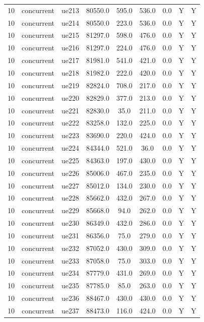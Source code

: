 \begin{table}[ht]
\begin{tabular}{|c|c|c|c|c|c|c|c|c|}
10 & concurrent & ue213 & 80550.0 & 595.0 & 536.0 & 0.0 & Y & Y \\
10 & concurrent & ue214 & 80550.0 & 223.0 & 536.0 & 0.0 & Y & Y \\
10 & concurrent & ue215 & 81297.0 & 598.0 & 476.0 & 0.0 & Y & Y \\
10 & concurrent & ue216 & 81297.0 & 224.0 & 476.0 & 0.0 & Y & Y \\
10 & concurrent & ue217 & 81981.0 & 541.0 & 421.0 & 0.0 & Y & Y \\
10 & concurrent & ue218 & 81982.0 & 222.0 & 420.0 & 0.0 & Y & Y \\
10 & concurrent & ue219 & 82824.0 & 708.0 & 217.0 & 0.0 & Y & Y \\
10 & concurrent & ue220 & 82829.0 & 377.0 & 213.0 & 0.0 & Y & Y \\
10 & concurrent & ue221 & 82830.0 & 35.0 & 211.0 & 0.0 & Y & Y \\
10 & concurrent & ue222 & 83258.0 & 132.0 & 225.0 & 0.0 & Y & Y \\
10 & concurrent & ue223 & 83690.0 & 220.0 & 424.0 & 0.0 & Y & Y \\
10 & concurrent & ue224 & 84344.0 & 521.0 & 36.0 & 0.0 & Y & Y \\
10 & concurrent & ue225 & 84363.0 & 197.0 & 430.0 & 0.0 & Y & Y \\
10 & concurrent & ue226 & 85006.0 & 467.0 & 235.0 & 0.0 & Y & Y \\
10 & concurrent & ue227 & 85012.0 & 134.0 & 230.0 & 0.0 & Y & Y \\
10 & concurrent & ue228 & 85662.0 & 432.0 & 267.0 & 0.0 & Y & Y \\
10 & concurrent & ue229 & 85668.0 & 94.0 & 262.0 & 0.0 & Y & Y \\
10 & concurrent & ue230 & 86349.0 & 432.0 & 286.0 & 0.0 & Y & Y \\
10 & concurrent & ue231 & 86356.0 & 75.0 & 279.0 & 0.0 & Y & Y \\
10 & concurrent & ue232 & 87052.0 & 430.0 & 309.0 & 0.0 & Y & Y \\
10 & concurrent & ue233 & 87058.0 & 75.0 & 303.0 & 0.0 & Y & Y \\
10 & concurrent & ue234 & 87779.0 & 431.0 & 269.0 & 0.0 & Y & Y \\
10 & concurrent & ue235 & 87785.0 & 85.0 & 263.0 & 0.0 & Y & Y \\
10 & concurrent & ue236 & 88467.0 & 430.0 & 430.0 & 0.0 & Y & Y \\
10 & concurrent & ue237 & 88473.0 & 116.0 & 424.0 & 0.0 & Y & Y \\

\end{tabular}
\end{table}
